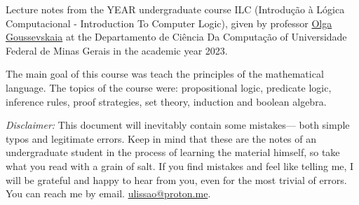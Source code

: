 Lecture notes from the YEAR undergraduate course ILC (Introdução à Lógica Computacional - Introduction To Computer Logic), given by professor
\href{buscatextual.cnpq.br/buscatextual/visualizacv.do;jsessionid=2C11C72FEDD7A307CEDDCFF01DBF81A3.buscatextual_0}{Olga Goussevskaia} at the Departamento de Ciência Da Computação of Universidade Federal de Minas Gerais in the academic year 2023.

The main goal of this course was teach the principles of the mathematical language. The topics of the course were: propositional logic, predicate logic, inference rules, proof strategies, set theory, induction and boolean algebra.

\textit{Disclaimer:} This document will inevitably contain some mistakes— both
simple typos and legitimate errors. Keep in mind that these are the notes of an
undergraduate student in the process of learning the material himself, so take
what you read with a grain of salt. If you find mistakes and feel like telling
me, I will be grateful and happy to hear from you, even for the most trivial of
errors. You can reach me by email.
\href{mailto:ulissao@proton.me}{ulissao@proton.me}.